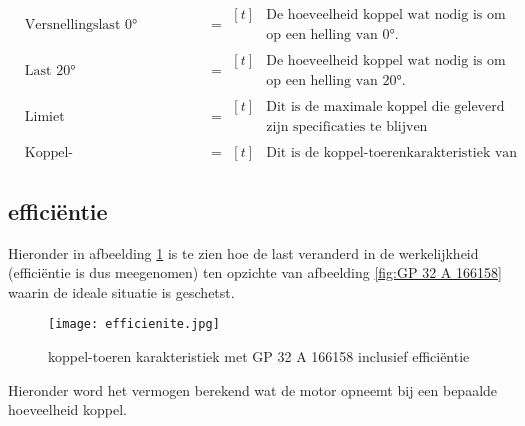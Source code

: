         \begin{align*}
                & \text{Versnellingslast 0°} &&= \begin{aligned}[t] & \text{De hoeveelheid koppel wat nodig is om maximaal te versnellen} \\ & \text{op een helling van 0°.} \end{aligned}\\
                & \text{Last 20°} &&= \begin{aligned}[t] & \text{De hoeveelheid koppel wat nodig is om stil te blijven staan} \\ & \text{op een helling van 20°.} \end{aligned}\\
                & \text{Limiet} &&= \begin{aligned}[t] & \text{Dit is de maximale koppel die geleverd mag worden om binnen}\\ & \text{zijn specificaties te blijven} \end{aligned}\\
                & \text{Koppel-toerenkarakteristiek motor} &&= \begin{aligned}[t] & \text{Dit is de koppel-toerenkarakteristiek van de motor.} \end{aligned}
            \end{align*}
\newpage
\subsection{efficiëntie}
Hieronder in afbeelding \ref{fig:efficientie} is te zien hoe de last veranderd in de werkelijkheid (efficiëntie is dus meegenomen) ten opzichte van afbeelding \ref{fig:GP 32 A 166158} waarin de ideale situatie is geschetst.

\begin{figure}[H]
        \centering
        \texttt{[image: efficienite.jpg]}
        \caption{koppel-toeren karakteristiek met GP 32 A 166158 inclusief efficiëntie}
        \label{fig:efficientie}
\end{figure}

Hieronder word het vermogen berekend wat de motor opneemt bij een bepaalde hoeveelheid koppel.

